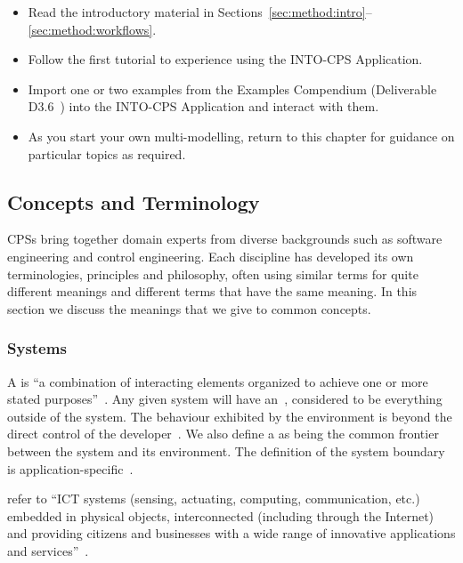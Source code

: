 \begin{itemize}
  \item Read the introductory material in Sections~\ref{sec:method:intro}--\ref{sec:method:workflows}.
  \item Follow the first tutorial to experience using the INTO-CPS Application.
  \item Import one or two examples from the Examples Compendium (Deliverable D3.6~\cite{INTOCPSD3.6}) into the INTO-CPS Application and interact with them.
  \item As you start your own multi-modelling, return to this chapter for guidance on particular topics as required.
\end{itemize}

\subsection{Concepts and Terminology}
\label{sec:method:concepts}

CPSs bring together domain experts from  diverse backgrounds such as software engineering and control engineering. Each discipline has developed its own terminologies, principles and philosophy, often using similar terms for quite different meanings and different terms that have the same meaning. In this section we discuss the meanings that we give to common concepts.

\subsubsection{Systems}
\label{sec:concepts:systems}
A  is ``a combination of interacting elements organized to achieve one or more stated purposes''~\cite{INCOSEseh15}. Any given system will have an~, considered to be everything outside of the system. The behaviour exhibited by the environment is beyond the direct control of the developer~\cite{Broenink&12b}. We also define a  as being the common frontier between the system and its environment. The definition of the system boundary is application-specific~\cite{Broenink&12b}.

 refer to ``ICT systems (sensing, actuating, computing, communication, etc.) embedded in physical objects, interconnected (including through the Internet) and providing citizens and businesses with a wide range of innovative applications and services''~\cite{Thompson13, Deka&15}.

